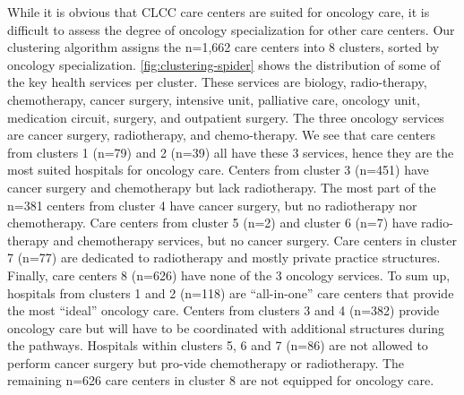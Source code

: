While it is obvious that CLCC care centers are suited for oncology care, it is difficult to assess the degree of oncology specialization for other care centers. Our clustering algorithm assigns the n=1,662 care centers into 8 clusters, sorted by oncology specialization. \cref{fig:clustering-spider} shows the distribution of some of the key health services per cluster. These services are biology, radio-therapy, chemotherapy, cancer surgery, intensive unit, palliative care, oncology unit, medication circuit, surgery, and outpatient surgery. The three oncology services are cancer surgery, radiotherapy, and chemo-therapy. We see that care centers from clusters 1 (n=79) and 2 (n=39) all have these 3 services, hence they are the most suited hospitals for oncology care. Centers from cluster 3 (n=451) have cancer surgery and chemotherapy but lack radiotherapy. The most part of the n=381 centers from cluster 4 have cancer surgery, but no radiotherapy nor chemotherapy. Care centers from cluster 5 (n=2) and cluster 6 (n=7) have radio-therapy and chemotherapy services, but no cancer surgery. Care centers in cluster 7 (n=77) are dedicated to radiotherapy and mostly private practice structures. Finally, care centers 8 (n=626) have none of the 3 oncology services. To sum up, hospitals from clusters 1 and 2 (n=118) are “all-in-one” care centers that provide the most “ideal” oncology care. Centers from clusters 3 and 4 (n=382) provide oncology care but will have to be coordinated with additional structures during the pathways. Hospitals within clusters 5, 6 and 7 (n=86) are not allowed to perform cancer surgery but pro-vide chemotherapy or radiotherapy. The remaining n=626 care centers in cluster 8 are not equipped for oncology care.

